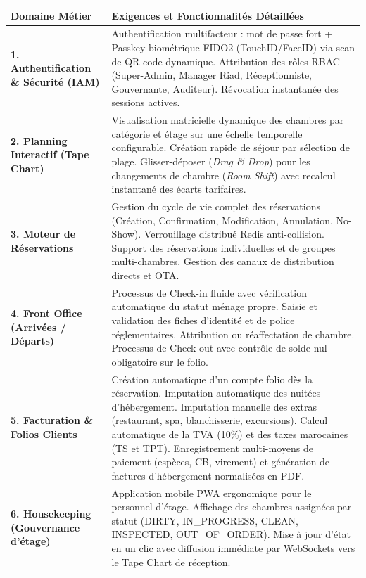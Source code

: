 \documentclass[12pt,a4paper,oneside]{report}
\begin{document}
\begin{table}[H]
\centering
\small
\renewcommand{\arraystretch}{1.3}
\begin{tabularx}{\textwidth}{|p{3.8cm}|X|}
\hline
\textbf{Domaine Métier} & \textbf{Exigences et Fonctionnalités Détaillées} \\
\hline
\textbf{1. Authentification \& Sécurité (IAM)} & Authentification multifacteur : mot de passe fort + Passkey biométrique FIDO2 (TouchID/FaceID) via scan de QR code dynamique. Attribution des rôles RBAC (Super-Admin, Manager Riad, Réceptionniste, Gouvernante, Auditeur). Révocation instantanée des sessions actives. \\
\hline
\textbf{2. Planning Interactif (Tape Chart)} & Visualisation matricielle dynamique des chambres par catégorie et étage sur une échelle temporelle configurable. Création rapide de séjour par sélection de plage. Glisser-déposer (\textit{Drag \& Drop}) pour les changements de chambre (\textit{Room Shift}) avec recalcul instantané des écarts tarifaires. \\
\hline
\textbf{3. Moteur de Réservations} & Gestion du cycle de vie complet des réservations (Création, Confirmation, Modification, Annulation, No-Show). Verrouillage distribué Redis anti-collision. Support des réservations individuelles et de groupes multi-chambres. Gestion des canaux de distribution directs et OTA. \\
\hline
\textbf{4. Front Office (Arrivées / Départs)} & Processus de Check-in fluide avec vérification automatique du statut ménage propre. Saisie et validation des fiches d'identité et de police réglementaires. Attribution ou réaffectation de chambre. Processus de Check-out avec contrôle de solde nul obligatoire sur le folio. \\
\hline
\textbf{5. Facturation \& Folios Clients} & Création automatique d'un compte folio dès la réservation. Imputation automatique des nuitées d'hébergement. Imputation manuelle des extras (restaurant, spa, blanchisserie, excursions). Calcul automatique de la TVA (10\%) et des taxes marocaines (TS et TPT). Enregistrement multi-moyens de paiement (espèces, CB, virement) et génération de factures d'hébergement normalisées en PDF. \\
\hline
\textbf{6. Housekeeping (Gouvernance d'étage)} & Application mobile PWA ergonomique pour le personnel d'étage. Affichage des chambres assignées par statut (DIRTY, IN\_PROGRESS, CLEAN, INSPECTED, OUT\_OF\_ORDER). Mise à jour d'état en un clic avec diffusion immédiate par WebSockets vers le Tape Chart de réception. \\

\end{tabularx}
\end{table}
\end{document}
